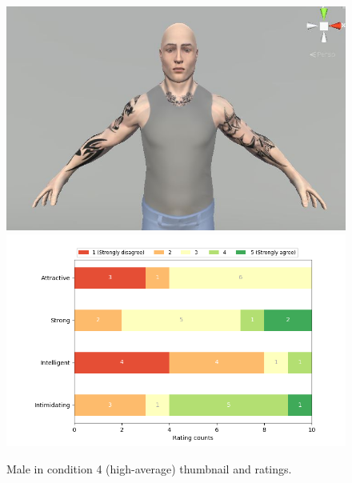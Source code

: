 \begin{figure}[H]
  \includegraphics[width=\linewidth]{Images/Males/3.JPG}
\endminipage\hfill
{}
  \includegraphics[width=\linewidth]{Survey/avatar_m_experiment4.png}
\endminipage\hfill
\caption{Male in condition 4 (high-average) thumbnail and ratings.}
\end{figure}

